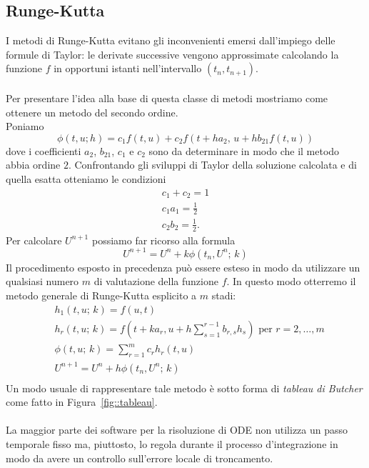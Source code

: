 \subsection{Runge-Kutta}
I metodi di Runge-Kutta evitano gli inconvenienti emersi dall'impiego delle formule di Taylor: le derivate successive vengono  approssimate calcolando la funzione $f$ in  opportuni istanti  nell'intervallo $\left(t_n , t_{n+1}\right)$.\\ \\
Per presentare l'idea alla base di questa classe di metodi mostriamo come ottenere un metodo del secondo ordine.\\
Poniamo 
$$ \phi(t,u;h) = c_1 f(t,u) + c_2 f\left(t+ ha_2, \, u + hb_{21}f(t,u)\right)$$
dove i coefficienti $a_2$, $b_{21}$, $c_1$ e $c_2$ sono da determinare in modo che il metodo abbia ordine $2$.  Confrontando gli sviluppi di Taylor della soluzione calcolata e di quella esatta otteniamo  le condizioni 
\begin{equation}
\begin{aligned}
c_1 + c_2 = 1\\
c_1a_1= \frac{1}{2}\\
c_2b_2 = \frac{1}{2}	.
\end{aligned}
\end{equation}
Per calcolare $U^{n+1}$ possiamo far ricorso  alla formula
$$ U^{n+1} = U^n + k \phi\left(t_n,U^n;\,k\right)$$
Il procedimento esposto  in precedenza pu\`o essere esteso in modo da utilizzare un qualsiasi numero $m$ di valutazione della funzione $f$.  In questo modo otterremo il metodo generale di Runge-Kutta esplicito a $m$ stadi:
\begin{equation}
\begin{aligned}
&h_1(t,u;\,k) = f(u,t) \\
&h_r(t,u;\,k) = f\left( t + k a_r, u + h \sum_{s=1}^{r-1} b_{r,s} h_s\right) \text{ per } r = 2, \dots, m \\
&\phi\left( t, u;\,k\right) = \sum_{r=1}^m c_r h_r(t,u)\\
&U^{n+1}= U^n + h \phi\left( t_n, U^n;\, k\right)\\
\end{aligned}
\end{equation}
Un modo usuale di rappresentare tale metodo \`e sotto forma di \textit{tableau di Butcher} come fatto in Figura~\ref{fig::tableau}.\\ \\
La maggior parte dei software per la risoluzione di ODE non utilizza un passo temporale fisso ma, piuttosto, lo regola durante il processo d'integrazione in modo da avere un controllo sull'errore locale di troncamento.\\
